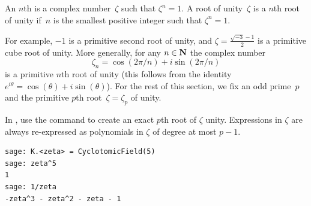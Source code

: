 \begin{definition}
   An $n$th  is a
  complex number~$\zeta$ such that $\zeta^n=1$.  A root of
  unity~$\zeta$ is a  $n$th root of unity if~$n$
  is the smallest positive integer such that $\zeta^n=1$.
\end{definition}
For example, $-1$ is a primitive second root of unity, and
$\zeta = \frac{\sqrt{-3}-1}{2}$ is a primitive cube root of
unity.
More generally, for any $n\in\mathbf{N}$  the complex number
$$
\zeta_n =\cos(2\pi{} /n) + i \sin(2\pi{}/n)
$$
is a primitive $n$th root of unity (this follows from the identity
$e^{i\theta} = \cos(\theta) + i\sin(\theta)$).  For the rest of this
section, we fix an odd prime~$p$ and the primitive $p$th
root~$\zeta=\zeta_p$ of unity.
\begin{sg}
In \sage, use the  command to create an exact
$p$th root of $\zeta$ unity.  Expressions in $\zeta$ are always
re-expressed as polynomials in $\zeta$ of degree at most $p-1$.
\begin{verbatim}
sage: K.<zeta> = CyclotomicField(5)
sage: zeta^5
1
sage: 1/zeta
-zeta^3 - zeta^2 - zeta - 1
\end{verbatim}
\end{sg}

